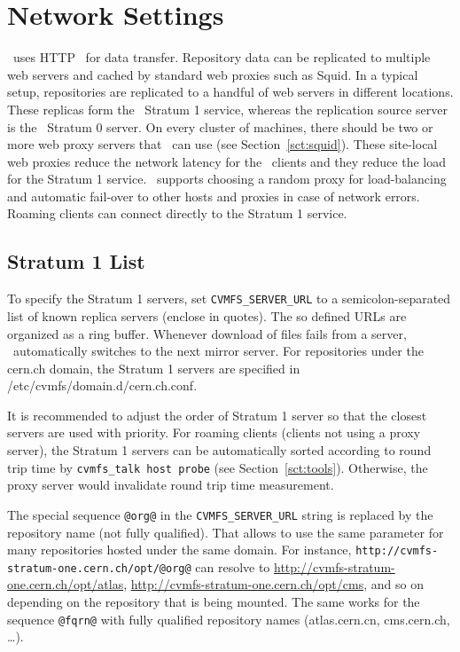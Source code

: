 \section{Network Settings}
\label{sct:config:network}
\cvmfs\ uses HTTP~\cite{rfc1945,rfc2616} for data transfer.
Repository data can be replicated to multiple web servers and cached by standard web proxies such as Squid.
In a typical setup, repositories are replicated to a handful of web servers in different locations.
These replicas form the \cvmfs\ Stratum 1 service, whereas the replication source server is the \cvmfs\ Stratum 0 server.
On every cluster of machines, there should be two or more web proxy servers that \cvmfs\ can use (see Section~\ref{sct:squid}).
These site-local web proxies reduce the network latency for the \cvmfs\ clients and they reduce the load for the Stratum 1 service.
\cvmfs\ supports choosing a random proxy for load-balancing and automatic fail-over to other hosts and proxies in case of network errors.
Roaming clients can connect directly to the Stratum 1 service.

\subsection{Stratum 1 List}
To specify the Stratum 1 servers, set \texttt{CVMFS\_SERVER\_URL} to a semicolon-separated list of known replica servers (enclose in quotes). 
The so defined URLs are organized as a ring buffer.
Whenever download of files fails from a server, \cvmfs\ automatically switches to the next mirror server.
For repositories under the cern.ch domain, the Stratum 1 servers are specified in /etc/cvmfs/domain.d/cern.ch.conf.

It is recommended to adjust the order of Stratum 1 server so that the closest servers are used with priority.
For roaming clients (\ie clients not using a proxy server), the Stratum 1 servers can be automatically sorted according to round trip time by \texttt{cvmfs\_talk host probe} (see Section~\ref{sct:tools}).
Otherwise, the proxy server would invalidate round trip time measurement.

The special sequence \texttt{@org@} in the \texttt{CVMFS\_SERVER\_URL} string is replaced by the repository name (not fully qualified).
That allows to use the same parameter for many repositories hosted under the same domain.
For instance, \texttt{http://cvmfs-stratum-one.cern.ch/opt/@org@} can resolve to \url{http://cvmfs-stratum-one.cern.ch/opt/atlas}, \url{http://cvmfs-stratum-one.cern.ch/opt/cms}, and so on depending on the repository that is being mounted.
The same works for the sequence \texttt{@fqrn@} with fully qualified repository names (\eg atlas.cern.cn, cms.cern.ch, \dots).

